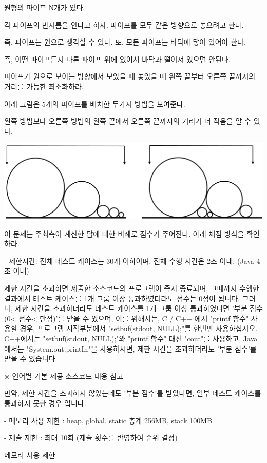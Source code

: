 \documentclass [12pt] {oblivoir}
\begin{document}
원형의 파이프 N개가 있다.

각 파이프의 반지름을 안다고 하자. 파이프를 모두 같은 방향으로 놓으려고 한다.

즉, 파이프는 원으로 생각할 수 있다. 또, 모든 파이프는 바닥에 닿아 있어야 한다.

즉, 어떤 파이프든지 다른 파이프 위에 있어서 바닥과 떨어져 있으면 안된다.

파이프가 원으로 보이는 방향에서 보았을 때 놓았을 때 왼쪽 끝부터 오른쪽 끝까지의 거리를 가능한 최소화하라.

아래 그림은 5개의 파이프를 배치한 두가지 방법을 보여준다.

왼쪽 방법보다 오른쪽 방법의 왼쪽 끝에서 오른쪽 끝까지의 거리가 더 작음을 알 수 있다.

\includegraphics[scale=0.5]{n4.png}


이 문제는 주최측이 계산한 답에 대한 비례로 점수가 주어진다. 아래 채점 방식을 확인하라.

- 제한시간: 전체 테스트 케이스는 30개 이하이며, 전체 수행 시간은 2초 이내. (Java 4초 이내)

제한 시간을 초과하면 제출한 소스코드의 프로그램이 즉시 종료되며, 그때까지 수행한 결과에서 테스트 케이스를 1개 그룹 이상 통과하였더라도 점수는 0점이 됩니다.
그러나, 제한 시간을 초과하더라도 테스트 케이스를 1개 그룹 이상 통과하였다면 '부분 점수(0< 점수< 만점)'를 받을 수 있으며, 이를 위해서는, C / C++ 에서 "printf 함수" 사용할 경우, 프로그램 시작부분에서 "setbuf(stdout, NULL);"를 한번만 사용하십시오.
C++에서는 "setbuf(stdout, NULL);"와 "printf 함수" 대신 "cout"를 사용하고, Java에서는 "System.out.printIn"을 사용하시면, 제한 시간을 초과하더라도 '부분 점수'를 받을 수 있습니다.

※ 언어별 기본 제공 소스코드 내용 참고

만약, 제한 시간을 초과하지 않았는데도 '부분 점수'를 받았다면, 일부 테스트 케이스를 통과하지 못한 경우 입니다.

- 메모리 사용 제한 : heap, global, static 총계 256MB, stack 100MB

- 제출 제한 : 최대 10회 (제출 횟수를 반영하여 순위 결정)


메모리 사용 제한
\end{document}
